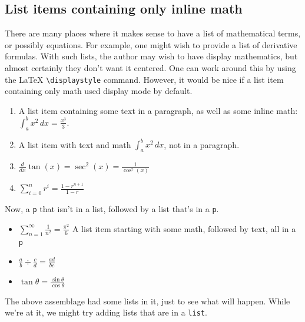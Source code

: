 \documentclass{amsart}
\theoremstyle{plain}%
\theoremstyle{definition}%
\theoremstyle{remark}%
\newcommand{\mono}[1]{\texttt{#1}}
\numberwithin{equation}{section}
\begin{document}
\subsection{List items containing only inline math}\label{test-second}%
\begin{assemblage}\label{math-list-test}%
%
There are many places where it makes sense to have a list of mathematical terms, or possibly equations. For example, one might wish to provide a list of derivative formulas. With such lists, the author may wish to have display mathematics, but almost certainly they don't want it centered. One can work around this by using the \LaTeX{} \mono{\textbackslash{}displaystyle} command. However, it would be nice if a list item containing only math used display mode by default.%
\par
%
\begin{enumerate}
\item{}A list item containing some text in a paragraph, as well as some inline math: \(\int_a^b x^2\,dx = \frac{x^3}{3}\).%
\item{}A list item with text and math \(\int_a^b x^2\,dx\), not in a paragraph.%
\item{}\(\displaystyle \frac{d}{dx}\tan(x) = \sec^2(x) = \frac{1}{\cos^2(x)}\)%
\item{}\(\displaystyle \sum_{i=0}^n r^i = \frac{1-r^{n+1}}{1-r}\)%
\end{enumerate}
%
\par
Now, a \mono{p} that isn't in a list, followed by a list that's in a \mono{p}.%
\par
%
\begin{itemize}[label=\textbullet]
\item{}\(\sum_{n=1}^\infty\frac{1}{n^2}=\frac{\pi^2}{6}\) A list item starting with some math, followed by text, all in a \mono{p}%
\item{}\(\displaystyle \frac{a}{b}\div \frac{c}{d} = \frac{ad}{bc}\)%
\item{}\(\displaystyle \tan\theta = \frac{\sin\theta}{\cos\theta}\)%
\end{itemize}
%
\end{assemblage}
The above assemblage had some lists in it, just to see what will happen. While we're at it, we might try adding lists that are in a \mono{list}.%
\end{document}
